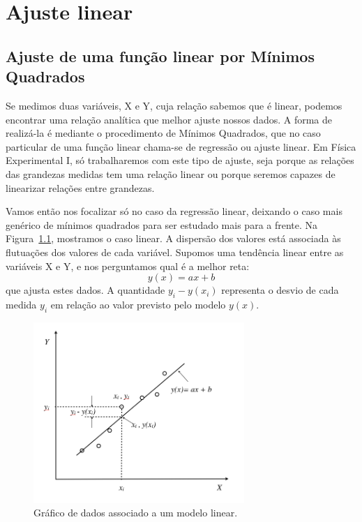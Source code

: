 \chapter{Ajuste linear}
\label{chap:minquad}
\section*{Ajuste de uma função linear por Mínimos Quadrados}
\label{sec:minquad}


Se medimos duas variáveis, X e Y, cuja relação sabemos que é linear, podemos encontrar uma relação analítica que melhor ajuste nossos dados. A forma de realizá-la é mediante o procedimento de Mínimos Quadrados, que no caso particular de uma função linear chama-se de regressão ou ajuste linear. Em Física Experimental I, só trabalharemos com este tipo de ajuste, seja porque as relações das grandezas medidas tem uma relação linear ou porque seremos capazes de linearizar relações entre grandezas.

Vamos então nos focalizar só no caso da regressão linear, deixando o caso mais genérico de mínimos quadrados para ser estudado mais para a frente. Na Figura~\ref{fig:ajuste}, mostramos o caso linear. A dispersão dos valores está associada às flutuações dos valores de cada variável. Supomos uma tendência linear entre as variáveis X e Y, e nos perguntamos qual é a melhor reta: 
\begin{equation}
y(x) = a x + b
\end{equation}
\noindent
que ajusta estes dados. A quantidade $y_i - y(x_i)$ representa o desvio de cada medida $y_i$ em relação ao valor previsto pelo modelo $y(x)$.

\begin{figure}[h]
\begin{center}
\includegraphics[width=8cm]{fig/GraficoAjusteLin}
\vspace{-0.4cm}
\caption{\label{fig:ajuste} Gráfico de dados associado a um modelo linear.}
\vspace{-1.5cm}
\end{center}
\end{figure}

